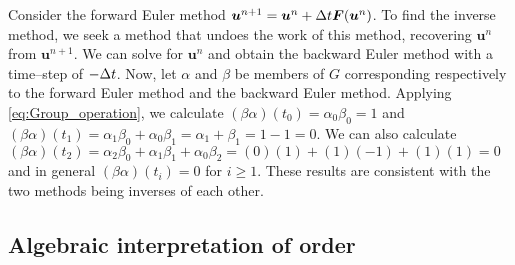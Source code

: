 \begin{example}\label{ex:FE_inv_2}
	Consider the forward Euler method $\bm{u}^{n+1} = \bm{u}^{n} + \Delta t \bm{F}(\bm{u}^{n})$. To find the inverse method, 		we seek a method that undoes the work of this method, recovering $\bm{u}^{n}$ from $\bm{u}^{n+1}$. We can solve for 
	$\bm{u}^{n}$ and obtain the backward Euler method with a time--step of $-\Delta t$. Now, let $\alpha$ and $\beta$ be 			members of $G$ corresponding respectively to the forward Euler method and the backward Euler method. Applying 				\eqref{eq:Group_operation}, we calculate $(\beta\alpha)(t_0) =\alpha_0\beta_0 = 1$ and $(\beta\alpha)(t_1) 						=\alpha_1\beta_0 + \alpha_0\beta_1 = \alpha_1 + \beta_1 	= 1 - 1 = 0$. We can also calculate $(\beta\alpha)(t_2) = 			\alpha_2\beta_0 + \alpha_1\beta_1 + \alpha_0\beta_2 =  (0)(1) + (1)(-1) + (1)(1) = 0$ and in general $(\beta\alpha)(t_i) 	= 0$ for $i \geq 1$. These results are consistent with the two methods being inverses of each other.
\end{example}

\subsection{Algebraic interpretation of order}\label{sec:Algebraic_order}

